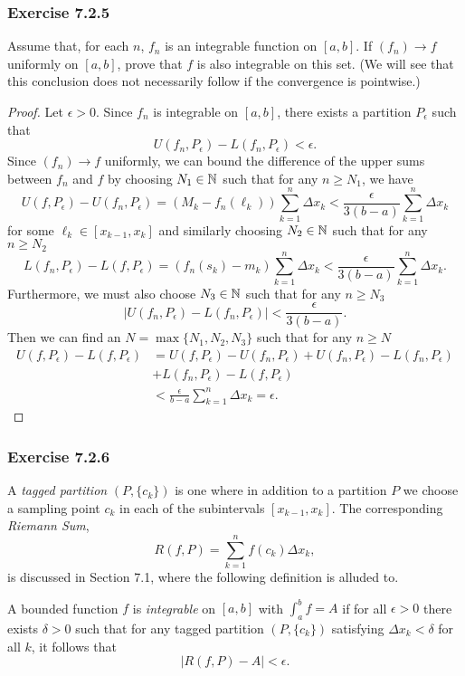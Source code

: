 \subsubsection{Exercise 7.2.5} Assume that, for each \( n  \), \( f_{n} \) is an integrable function on \( [a,b]  \). If \( (f_n) \to f  \) uniformly on \( [a,b]   \), prove that \( f  \) is also integrable on this set. (We will see that this conclusion does not necessarily follow if the convergence is pointwise.)
\begin{proof}
	Let \( \epsilon > 0  \). Since \( f_{n} \) is integrable on \( [a,b]  \), there exists a partition \( P_{\epsilon } \) such that 
	\[ U(f_{n}, P_{\epsilon }) - L(f_{n}, P_{\epsilon }) < \epsilon. \]
	Since \( (f_{n}) \to f  \) uniformly, we can bound the difference of the upper sums between \( f_{n} \) and \( f  \) by choosing \( N_{1} \in \mathbb{N}  \) such that for any \( n \geq N_{1}  \), we have
	\[  U(f, P_{\epsilon }) - U(f_{n}, P_{\epsilon }) = (M_{k} - f_{n}(\ell_k)) \sum_{ k=1 }^{ n } \Delta x_{k } < \frac{ \epsilon  }{  3(b -a)  } \sum_{ k=1 }^{ n } \Delta x_{ k }  \] for some \( \ell_{k } \in [x_{k-1}, x_{k }] \) and similarly choosing \( N_{2} \in \mathbb{N}  \) such that for any \( n \geq N_{2} \)
	\[  L(f_n, P_{\epsilon }) - L(f, P_{\epsilon }) = ( f_{n}(s_{k }) - m_{k}) \sum_{ k=1 }^{ n } \Delta x_{k } < \frac{ \epsilon  }{  3(b -a)  } \sum_{ k=1 }^{ n } \Delta x_{ k }.\] Furthermore, we must also choose \( N_{3} \in \mathbb{N}  \) such that for any \( n \geq N_{3} \) 
	\[  | U(f_{n}, P_{\epsilon }) - L(f_{n}, P_{\epsilon }) | < \frac{ \epsilon  }{ 3 (b-a) } . \]
	Then we can find an \( N = \max \{ N_{1}, N_{2}, N_{3} \}   \) such that for any \( n \geq N  \)
	\begin{align*}
		U(f, P_{\epsilon }) - L(f, P_{\epsilon }) &= U(f, P_{\epsilon }) - U(f_n, P_{\epsilon }) + U(f_{n}, P_{\epsilon }) - L(f_{n}, P_{\epsilon }) \\ 
												  &+ L(f_{n}, P_{\epsilon }) - L(f, P_{\epsilon }) \\
												  &< \frac{ \epsilon  }{ b - a  } \sum_{ k=1 }^{ n } \Delta x_{k} = \epsilon.
	\end{align*}
\end{proof}


\subsubsection{Exercise 7.2.6} A \textit{tagged partition} \( (P, \{ c_{k } \} ) \) is one where in addition to a partition \( P  \) we choose a sampling point \( c_{k } \) in each of the subintervals \( [ x_{k-1} , x_{k }]  \). The corresponding \textit{Riemann Sum}, 
\[  R(f, P ) = \sum_{ k=1 }^{ n } f(c_{k }) \Delta x_{k },  \] is discussed in Section 7.1, where the following definition is alluded to. 
	\begin{defn}
	A bounded function \( f  \) is \textit{integrable} on \( [a,b]  \) with \( \int_{ a }^{ b } f = A  \) if for all \( \epsilon > 0   \) there exists \( \delta > 0  \) such that for any tagged partition \( (P, \{ c_{k } \} ) \) satisfying \( \Delta x_{k } < \delta  \) for all \( k  \), it follows that 
	\[  | R(f,P) - A  | < \epsilon. \]
	\end{defn}


